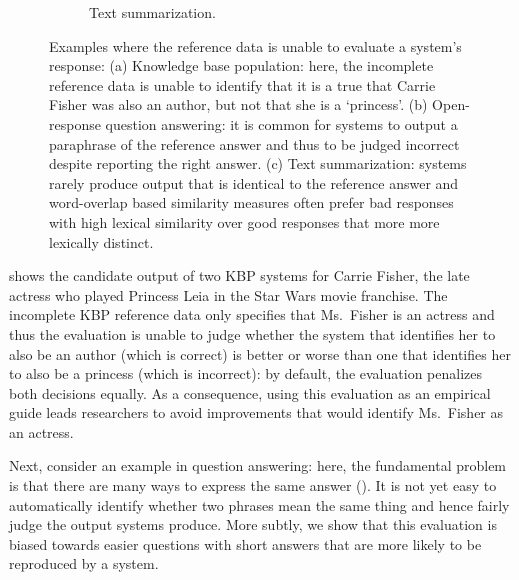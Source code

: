 \begin{figure}
\begin{subfigure}{0.65\textwidth}
    \caption{\label{fig:intro:example-summarization} Text summarization. }
  \end{subfigure}
  \caption[Examples highlighting the limitations of incomplete evaluation sets]{\label{fig:intro:examples} Examples where the reference data is unable to evaluate a system's response:
  (a) Knowledge base population: here, the incomplete reference data is unable to identify that it is a true that Carrie Fisher was also an author, but not that she is a `princess'.
  (b) Open-response question answering: it is common for systems to output a paraphrase of the reference answer and thus to be judged incorrect despite reporting the right answer.
  (c) Text summarization: systems rarely produce output that is identical to the reference answer and word-overlap based similarity measures often prefer bad responses with high lexical similarity over good responses that more more lexically distinct.  
  }
\end{figure}

 shows the candidate output of two KBP systems for Carrie Fisher, the late actress who played Princess Leia in the Star Wars movie franchise.
The incomplete KBP reference data only specifies that Ms.\ Fisher is an actress and thus the evaluation is unable to judge whether the system that identifies her to also be an author (which is correct) is better or worse than one that identifies her to also be a princess (which is incorrect): by default, the evaluation penalizes both decisions equally.
As a consequence, using this evaluation as an empirical guide leads researchers to avoid improvements that would identify Ms.\ Fisher as an actress.

Next, consider an example in question answering:
  here, the fundamental problem is that there are many ways to express the same answer ().
It is not yet easy to automatically identify whether two phrases mean the same thing and hence fairly judge the output systems produce.
More subtly, we show that this evaluation is biased towards easier questions with short answers that are more likely to be reproduced by a system.

